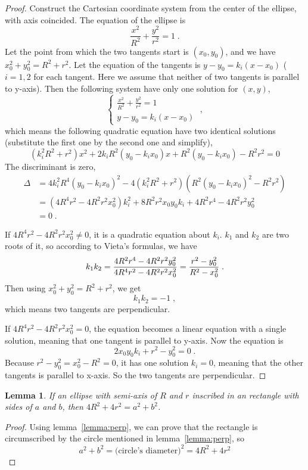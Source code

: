\documentclass[10pt,a4paper]{article}
\newtheorem{lemma}{Lemma}
\begin{document}
	\begin{proof}
		Construct the Cartesian coordinate system from the center of the ellipse, with axis coincided. The equation of the ellipse is
		\[
		\frac{x^2}{R^2}+\frac{y^2}{r^2}=1\;.
		\]
		Let the point from which the two tangents start is $(x_0,y_0)$, and we have $x_0^2+y_0^2=R^2+r^2$. Let the equation of the tangents is $y-y_0=k_i(x-x_0)$ ($i=1,2$ for each tangent. Here we assume that neither of two tangents is parallel to y-axis). Then the following system have only one solution for $(x,y)$,
		\[
		\left\lbrace \begin{array}{ll}
		\frac{x^2}{R^2}+\frac{y^2}{r^2}=1\\
		y-y_0=k_i(x-x_0)
		\end{array}\right. \;,
		\]
		which means the following quadratic equation have two identical solutions (substitute the first one by the second one and simplify),
		\[
		(k_i^2 R^2+r^2)x^2+2k_iR^2 (y_0-k_i x_0)x+R^2(y_0-k_i x_0)-R^2 r^2=0
		\]
		The discriminant is zero,
		\begin{align*}
		\Delta &= 4k_i^2R^4(y_0-k_i x_0)^2-4(k_i^2 R^2+r^2)(R^2(y_0-k_i x_0)^2-R^2 r^2) \\
		&=( 4R^4 r^2-4R^2 r^2x_0^2)k_i^2+8R^2r^2x_0y_0k_i+4R^2r^4-4R^2r^2y_0^2\\
		&=0\;.
		\end{align*}
		
		If $4R^4 r^2-4R^2 r^2x_0^2\neq 0$, it is a quadratic equation about $k_i$. $k_1$ and $k_2$ are two roots of it, so according to Vieta's formulas, we have
		\[
		k_1k_2 =\frac{4R^2r^4-4R^2r^2y_0^2}{4R^4 r^2-4R^2 r^2x_0^2}\\
		=\frac{r^2-y_0^2}{R^2-x_0^2}\;.
		\]
		Then using $x_0^2+y_0^2=R^2+r^2$, we get
		\[
		k_1k_2 =-1\;,
		\]
		which means two tangents are perpendicular.
		
		If  $4R^4 r^2-4R^2 r^2x_0^2= 0$, the equation becomes a linear equation with a single solution, meaning that one tangent is parallel to y-axis. Now the equation is
		\[
		2x_0y_0k_i+r^2-y_0^2=0\;.
		\]
		Because $r^2-y_0^2=x_0^2-R^2=0$, it has one solution $k_i=0$, meaning that the other tangents is parallel to x-axis. So the two tangents are perpendicular.
	\end{proof}
	\begin{lemma}
		\label{lemma:rect}
		If an ellipse with semi-axis of $R$ and $r$ inscribed in an rectangle with sides of $a$ and $b$, then $4R^2+4r^2=a^2+b^2$.
	\end{lemma}
	\begin{proof}
		Using lemma~\ref{lemma:perp}, we can prove that the rectangle is circumscribed by the circle mentioned in lemma~\ref{lemma:perp}, so
		\[
		a^2+b^2=\textrm{(circle's diameter)} ^2 = 4R^2+4r^2
		\]
	\end{proof}
	
\end{document}

